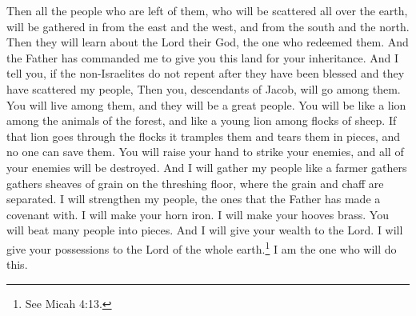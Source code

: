 Then all the people who are left of them, who will be scattered all over the earth, will be gathered in from the east and the west, and from the south and the north. Then they will learn about the Lord their God, the one who redeemed them.
\bverse \iffalse And the Father hath commanded me that I should give unto you this land, for your inheritance. \fi
And the Father has commanded me to give you this land for your inheritance.
\bverse \iffalse And I say unto you, that if the Gentiles do not repent after the blessing which they shall receive, after they have scattered my people-- \fi
And I tell you, if the non-Israelites do not repent after they have been blessed and they have scattered my people,
\bverse \iffalse Then shall ye, who are a remnant of the house of Jacob, go forth among them; and ye shall be in the midst of them who shall be many; and ye shall be among them as a lion among the beasts of the forest, and as a young lion among the flocks of sheep, who, if he goeth through both treadeth down and teareth in pieces, and none can deliver. \fi
Then you, descendants of Jacob, will go among them. You will live among them, and they will be a great people. You will be like a lion among the animals of the forest, and like a young lion among flocks of sheep. If that lion goes through the flocks it tramples them and tears them in pieces, and no one can save them.
\bverse \iffalse Thy hand shall be lifted up upon thine adversaries, and all thine enemies shall be cut off. \fi
You will raise your hand to strike your enemies, and all of your enemies will be destroyed.
\bverse \iffalse And I will gather my people together as a man gathereth his sheaves into the floor. \fi
And I will gather my people like a farmer gathers gathers sheaves of grain on the threshing floor, where the grain and chaff are separated.
\bverse \iffalse For I will make my people with whom the Father hath covenanted, yea, I will make thy horn iron, and I will make thy hoofs brass. And thou shalt beat in pieces many people; and I will consecrate their gain unto the Lord, and their substance unto the Lord of the whole earth. And behold, I am he who doeth it. \fi
I will strengthen my people, the ones that the Father has made a covenant with. I will make your horn iron. I will make your hooves brass. You will beat many people into pieces. And I will give your wealth to the Lord. I will give your possessions to the Lord of the whole earth.\footnote{See Micah 4:13.} I am the one who will do this.
